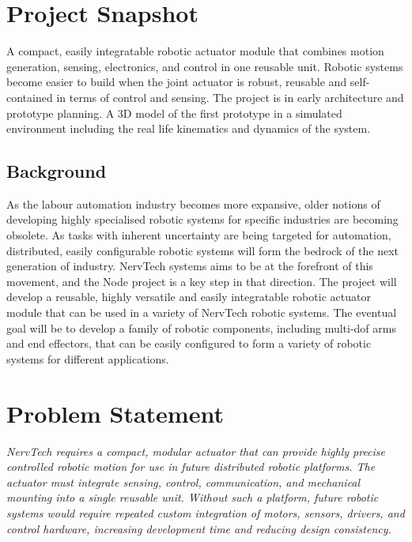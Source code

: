 \documentclass[public]{../../classes/nervtech-overview}
\begin{document}
\maketitle
\tableofcontents
\newpage

\section{Project Snapshot}

\projectsnapshot
{A compact, easily integratable robotic actuator module that combines motion generation, sensing, electronics, and control in one reusable unit.}
{Robotic systems become easier to build when the joint actuator is robust, reusable and self-contained in terms of control and sensing.}
{The project is in early architecture and prototype planning.}
{A 3D model of the first prototype in a simulated environment including the real life kinematics and dynamics of the system.}

\subsection*{Background}
As the labour automation industry becomes more expansive, older notions of developing
highly specialised robotic systems for specific industries are becoming obsolete.
As tasks with inherent uncertainty are being targeted for automation, distributed,
easily configurable robotic systems will form the bedrock of the next generation of
industry.
NervTech systems aims to be at the forefront of this movement, and the Node project
is a key step in that direction.
The project will develop a reusable, highly versatile and easily integratable robotic
actuator module that can be used in a variety of NervTech robotic systems.
The eventual goal will be to develop a family of robotic components, including multi-dof arms and end effectors, that can be easily configured to form a variety of robotic
systems for different applications.

\section{Problem Statement}
\textit{NervTech requires a compact, modular actuator that can provide highly precise controlled robotic motion for use in future distributed robotic platforms.
  The actuator must integrate sensing, control, communication, and mechanical mounting into a single reusable unit.
  Without such a platform, future robotic systems would require repeated custom integration of motors, sensors, drivers, and control hardware, increasing development time and reducing design consistency.}
\end{document}
